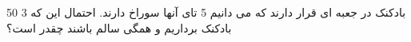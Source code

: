 50 بادکنک در جعبه ای قرار دارند که می دانیم 5 تای آنها سوراخ دارند.
احتمال این که 3 بادکنک برداریم و همگی سالم باشند چقدر است؟

\\
